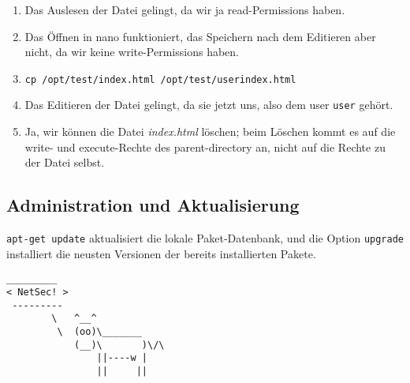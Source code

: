 \documentclass[12pt,a4paper]{article}
\begin{document}
\begin{enumerate}
    \item Das Auslesen der Datei gelingt, da wir ja read-Permissions haben.
    \item Das Öffnen in nano funktioniert, das Speichern nach dem Editieren aber nicht,
        da wir keine write-Permissions haben.
    \item \texttt{cp /opt/test/index.html /opt/test/userindex.html}
    \item Das Editieren der Datei gelingt, da sie jetzt uns, also dem user \texttt{user}
        gehört.
    \item Ja, wir können die Datei \textit{index.html} löschen; beim Löschen kommt
        es auf die write- und execute-Rechte des parent-directory an, nicht auf die Rechte
        zu der Datei selbst.
\end{enumerate}
\subsection{Administration und Aktualisierung}
\texttt{apt-get update} aktualisiert die lokale Paket-Datenbank, und die Option
\texttt{upgrade} installiert die neusten Versionen der bereits installierten Pakete.
\\
\begin{verbatim}
_________ 
< NetSec! >
 --------- 
        \   ^__^
         \  (oo)\_______
            (__)\       )\/\
                ||----w |
                ||     ||
\end{verbatim}
\end{document}
